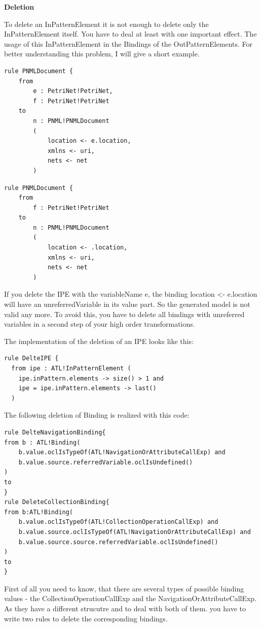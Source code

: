 \documentclass{llncs}
\begin{document}
\textbf{Deletion}

To delete an InPatternElement it is not enough to delete only the InPatternElement itself. You have to deal at least with one important effect. The usage of this InPatternElement in the Bindings of the OutPatternElements.
For better understanding this problem, I will give a short example.

\begin{lstlisting}
rule PNMLDocument {
	from
		e : PetriNet!PetriNet,
		f : PetriNet!PetriNet
	to	
		n : PNML!PNMLDocument
		(
			location <- e.location,
			xmlns <- uri,
			nets <- net			
		)
\end{lstlisting}

\begin{lstlisting}
rule PNMLDocument {
	from
		f : PetriNet!PetriNet
	to	
		n : PNML!PNMLDocument
		(
			location <- .location,
			xmlns <- uri,
			nets <- net			
		)
\end{lstlisting}

If you delete the IPE with the variableName e, the binding location <- e.location will have an unreferredVariable in its value part. So the generated model is not valid any more. To avoid this, you have to delete all bindings with unreferred variables in a second step of your high order transformations.

The implementation of the deletion of an IPE looks like this:
\begin{lstlisting}
rule DelteIPE {
  from ipe : ATL!InPatternElement (
    ipe.inPattern.elements -> size() > 1 and
    ipe = ipe.inPattern.elements -> last()
  )
\end{lstlisting}

The following deletion of Binding is realized with this code:
\begin{lstlisting}
rule DelteNavigationBinding{
from b : ATL!Binding(
	b.value.oclIsTypeOf(ATL!NavigationOrAttributeCallExp) and 
	b.value.source.referredVariable.oclIsUndefined()
)
to
}
rule DeleteCollectionBinding{
from b:ATL!Binding(		
	b.value.oclIsTypeOf(ATL!CollectionOperationCallExp) and 
	b.value.source.oclIsTypeOf(ATL!NavigationOrAttributeCallExp) and 
	b.value.source.source.referredVariable.oclIsUndefined()
)
to
}
\end{lstlisting}

First of all you need to know, that there are several types of possible binding values - the CollectionOperationCallExp and the NavigationOrAttributeCallExp.
As they have a different strucutre and to deal with both of them. you have to write two rules to delete the corresponding bindings.
\end{document}
